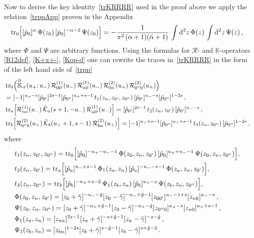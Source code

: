 \documentclass[a4paper,11pt]{article}
\newcommand{\tr}{\mathop{\rm tr}\nolimits}
\numberwithin{equation}{section}
\begin{document}
Now to derive the key identity~\eqref{trKRRRR} used in the proof above we apply the relation~\eqref{trppApp} proven in the Appendix
\begin{equation} \label{trpp}
	\tr_0\Bigl[[\hat{p}_0]^\alpha\,\Phi(z_0)\,[\hat{p}_0]^{-\alpha-2}\,\Psi(z_0)\Bigr] =
	-\frac{1}{\pi^2\,(\alpha+1)(\bar{\alpha}+1)} \,
	\int \mathrm{d}^2z \, \Phi(z) \, \int \mathrm{d}^2z \, \Psi(z) \,,
\end{equation}
where $\Phi$ and $\Psi$ are arbitrary functions.
Using the formulas for $\mathcal{R}$- and $\mathbb{K}$-operators \eqref{R12def}, \eqref{K+x+-}, \eqref{Kop-d}
one can rewrite the traces in~\eqref{trKRRRR} in the form of the left hand side of~\eqref{trpp}
\begin{align}
	& \nonumber
	\begin{aligned}
		&
		\tr_0\Bigl( \overset{0}{\mathbb{K}}_+(u_+;u_-)\,\mathcal{R}^{(1)}_{00'}(u_-)\,\mathcal{R}^{(1)}_{n0}(u_-)\,\mathcal{R}^{(2)}_{0n}(u_+)\,\mathcal{R}^{(2)}_{0''0}(u_+) \Bigr) \\
		& = [-1]^{u_+-s}
		[\hat{p}_{0'}]^{2s-1}[\hat{p}_{0''}]^{u_++s-1} \, t_1(z_n, z_{0'}, z_{0''}) \, [\hat{p}_{0'}]^{u_--s}[\hat{p}_{0''}]^{1-2s} \,,
	\end{aligned} 
	\\
	& \nonumber
	\tr_a\Bigl[\mathcal{R}^{(1)}_{na}(u_-)\,\tilde{\mathcal{K}}_a(s+1,-u_-)\,\mathcal{R}^{(1)}_{a0'}(u_-)\Bigr] =
	[\hat{p}_{0'}]^{2s-1} \, t_2(z_n, z_{0'}) \, [\hat{p}_{0'}]^{u_--s} \,, \\
	& \nonumber
	\tr_b\Bigl[\mathcal{R}^{(2)}_{0''b}(u_+)\,\tilde{\mathcal{K}}_b(u_++1,s-1)\,\mathcal{R}^{(2)}_{bn}(u_+)\Bigr] =
	[-1]^{u_++s-1}
	[\hat{p}_{0''}]^{u_++s-1} \, t_3(z_n, z_{0''}) \, [\hat{p}_{0''}]^{1-2s} \,,
\end{align}
where
\begin{align}
	& \nonumber
	t_1(z_n, z_{0'}, z_{0''}) = \tr_0\Bigl[[\hat{p}_0]^{-u_+-u_--1}\,\Phi(z_0, z_n, z_{0'})\,[\hat{p}_0]^{u_++u_--1}\,\Psi(z_0, z_n, z_{0''})\Bigr] , \\
	& \nonumber
	t_2(z_n, z_{0'}) =
	\tr_a\Bigl[[\hat{p}_a]^{u_-+s-1}\,\Phi_1(z_a, z_n)\,[\hat{p}_a]^{-u_--s-1}\,\Phi(z_a, z_n, z_{0'})\Bigr] , \\
	& \nonumber
	t_3(z_n, z_{0''}) =
	\tr_b\Bigl[[\hat{p}_b]^{-u_++s-2}\,\Psi_1(z_b, z_n)\,[\hat{p}_b]^{u_+-s}\,\Psi(z_b, z_n, z_{0''})\Bigr] , \\
	& \nonumber
	\Phi(z_0, z_n, z_{0'}) =
	[z_0+\tilde{\gamma}]^{-u_--\tilde{g}} [z_0-\tilde{\gamma}]^{-u_-+\tilde{g}-1} [z_{00'}]^{u_--1+s} [z_{n0}]^{u_--s} \,, \\
	& \nonumber
	\Psi(z_0, z_n, z_{0''}) =
	[z_0+\tilde{\gamma}]^{-u_++\tilde{g}-1} [z_0-\tilde{\gamma}]^{-u_+-\tilde{g}} [z_{0''0}]^{u_+-s} [z_{n0}]^{u_++s-1} \,, \\
	& \nonumber
	\Phi_1(z_a, z_n) = [z_{na}]^{2s-1}[z_a+\tilde{\gamma}]^{-s+\tilde{g}-1}[z_a-\tilde{\gamma}]^{-s-\tilde{g}} \,, \\
	& \nonumber
	\Psi_1(z_b, z_n) = [z_{bn}]^{1-2s}[z_b+\tilde{\gamma}]^{s-\tilde{g}-1}[z_b-\tilde{\gamma}]^{s+\tilde{g}-2} \,.
\end{align}
\end{document}

